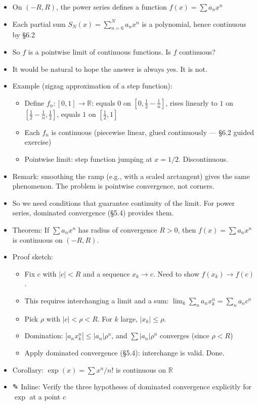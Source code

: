 \documentclass[
  10pt,
  letterpaper,
]{scrbook}
\providecommand{\tightlist}{%
  \setlength{\itemsep}{0pt}\setlength{\parskip}{0pt}}
\newcommand{\RR}{\mathbb{R}}
\begin{document}
\begin{itemize}
\tightlist
\item
  On \((-R, R)\), the power series defines a function
  \(f(x) = \sum a_n x^n\)
\item
  Each partial sum \(S_N(x) = \sum_{n=0}^{N} a_n x^n\) is a polynomial,
  hence continuous by §6.2
\item
  So \(f\) is a pointwise limit of continuous functions. Is \(f\)
  continuous?
\item
  It would be natural to hope the answer is always yes. It is not.
\item
  Example (zigzag approximation of a step function):

  \begin{itemize}
  \tightlist
  \item
    Define \(f_n: [0, 1] \to \RR\): equals \(0\) on
    \([0, \tfrac{1}{2} - \tfrac{1}{n}]\), rises linearly to \(1\) on
    \([\tfrac{1}{2} - \tfrac{1}{n}, \tfrac{1}{2}]\), equals \(1\) on
    \([\tfrac{1}{2}, 1]\)
  \item
    Each \(f_n\) is continuous (piecewise linear, glued continuously ---
    §6.2 guided exercise)
  \item
    Pointwise limit: step function jumping at \(x = 1/2\).
    Discontinuous.
  \end{itemize}
\item
  Remark: smoothing the ramp (e.g., with a scaled arctangent) gives the
  same phenomenon. The problem is pointwise convergence, not corners.
\item
  So we need conditions that guarantee continuity of the limit. For
  power series, dominated convergence (§5.4) provides them.
\item
  Theorem: If \(\sum a_n x^n\) has radius of convergence \(R > 0\), then
  \(f(x) = \sum a_n x^n\) is continuous on \((-R, R)\).
\item
  Proof sketch:

  \begin{itemize}
  \tightlist
  \item
    Fix \(c\) with \(|c| < R\) and a sequence \(x_k \to c\). Need to
    show \(f(x_k) \to f(c)\).
  \item
    This requires interchanging a limit and a sum:
    \(\lim_k \sum_n a_n x_k^n = \sum_n a_n c^n\)
  \item
    Pick \(\rho\) with \(|c| < \rho < R\). For \(k\) large,
    \(|x_k| \leq \rho\).
  \item
    Domination: \(|a_n x_k^n| \leq |a_n| \rho^n\), and
    \(\sum |a_n| \rho^n\) converges (since \(\rho < R\))
  \item
    Apply dominated convergence (§5.4): interchange is valid. Done.
  \end{itemize}
\item
  Corollary: \(\exp(x) = \sum x^n/n!\) is continuous on \(\RR\)
\item
  ✎ Inline: Verify the three hypotheses of dominated convergence
  explicitly for \(\exp\) at a point \(c\)
\end{itemize}
\end{document}
